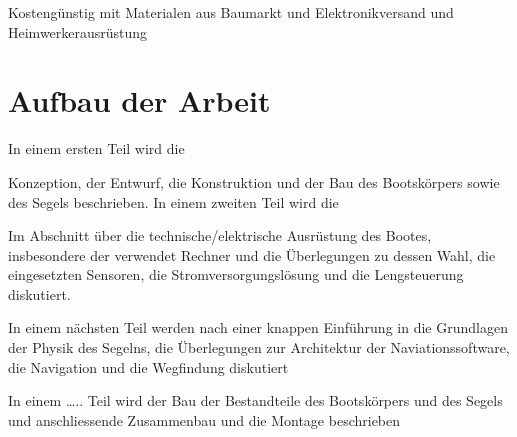 Kostengünstig mit Materialen aus Baumarkt und Elektronikversand und Heimwerkerausrüstung


\section{Aufbau der Arbeit}
In einem ersten Teil wird die 

 Konzeption, der Entwurf, die Konstruktion und der Bau des Bootskörpers sowie des Segels beschrieben. In einem zweiten Teil wird die

  Im Abschnitt über die technische/elektrische Ausrüstung des Bootes, insbesondere der verwendet Rechner und die Überlegungen zu dessen Wahl, die eingesetzten Sensoren, die Stromversorgungslösung und die Lengsteuerung diskutiert.

 In einem nächsten Teil werden nach einer knappen Einführung in die Grundlagen der Physik des Segelns, die Überlegungen zur Architektur der Naviationssoftware, die Navigation und die Wegfindung diskutiert

 In einem ….. Teil wird der Bau der Bestandteile des Bootskörpers und des Segels und anschliessende Zusammenbau und die Montage beschrieben 

  